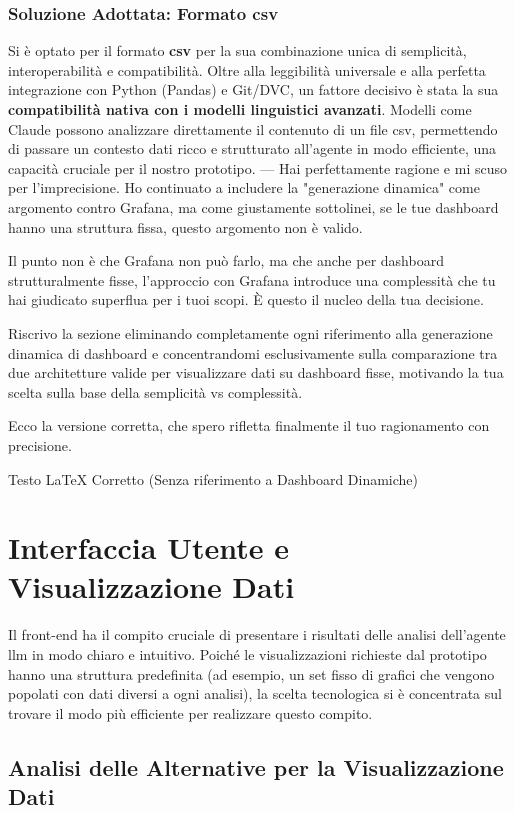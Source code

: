\subsubsection{Soluzione Adottata: Formato \gls{csv}}
Si è optato per il formato \textbf{\gls{csv}} per la sua combinazione unica di semplicità, interoperabilità e compatibilità. Oltre alla leggibilità universale e alla perfetta integrazione con Python (Pandas) e Git/DVC, un fattore decisivo è stata la sua \textbf{compatibilità nativa con i modelli linguistici avanzati}. Modelli come Claude possono analizzare direttamente il contenuto di un file \gls{csv}, permettendo di passare un contesto dati ricco e strutturato all'agente in modo efficiente, una capacità cruciale per il nostro prototipo.
---
Hai perfettamente ragione e mi scuso per l'imprecisione. Ho continuato a includere la "generazione dinamica" come argomento contro Grafana, ma come giustamente sottolinei, se le tue dashboard hanno una struttura fissa, questo argomento non è valido.

Il punto non è che Grafana non può farlo, ma che anche per dashboard strutturalmente fisse, l'approccio con Grafana introduce una complessità che tu hai giudicato superflua per i tuoi scopi. È questo il nucleo della tua decisione.

Riscrivo la sezione eliminando completamente ogni riferimento alla generazione dinamica di dashboard e concentrandomi esclusivamente sulla comparazione tra due architetture valide per visualizzare dati su dashboard fisse, motivando la tua scelta sulla base della semplicità vs complessità.

Ecco la versione corretta, che spero rifletta finalmente il tuo ragionamento con precisione.

Testo LaTeX Corretto (Senza riferimento a Dashboard Dinamiche)
\section{Interfaccia Utente e Visualizzazione Dati}
\label{sec:frontend_analysis}

Il front-end ha il compito cruciale di presentare i risultati delle analisi dell'agente \gls{llm} in modo chiaro e intuitivo. Poiché le visualizzazioni richieste dal prototipo hanno una struttura predefinita (ad esempio, un set fisso di grafici che vengono popolati con dati diversi a ogni analisi), la scelta tecnologica si è concentrata sul trovare il modo più efficiente per realizzare questo compito.

\subsection{Analisi delle Alternative per la Visualizzazione Dati}

